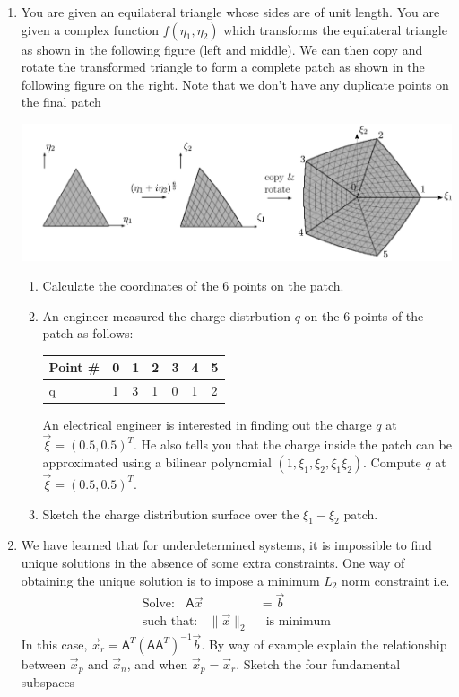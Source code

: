 \documentclass[a4paper, 11pt]{article}
\newcommand{\mat}[1]{\boldsymbol { \mathsf{#1}} }
\begin{document}
\begin{enumerate}
\item You are given an equilateral triangle whose sides are of unit length. You are given a complex function $f(\eta_1, \eta_2)$ which transforms the equilateral triangle as shown in the following figure (left and middle). We can then copy and rotate the transformed triangle to form a complete patch as shown in the following figure on the right. Note that we don't have any duplicate points on the final patch 
\begin{center}
  \includegraphics[scale=0.4]{figs/q1.pdf}
\end{center}
\begin{enumerate}[label=(\alph*)]
\item Calculate the coordinates of the 6 points on the patch.
\item An engineer measured the charge distrbution $q$ on the 6 points of the patch as follows:
    \begin{center}
    \begin{tabular}{ | l | l | l | l | l | l | l |}
    \hline
    Point \# & 0 & 1 & 2 & 3 & 4 & 5  \\ \hline
    q        & 1 & 3 & 1 & 0 & 1 & 2 \\ \hline
    \end{tabular}
    \end{center}
    An electrical engineer is interested in finding out the charge $q$ at $\vec \xi = (0.5, 0.5)^T$. He also tells you that the charge inside the patch can be approximated using a bilinear polynomial $(1, \xi_1, \xi_2,\xi_1\xi_2)$. Compute $q$ at $\vec \xi = (0.5, 0.5)^T$. 
    \item Sketch the charge distribution surface over the $\xi_1 - \xi_2$ patch.
\end{enumerate}

\item We have learned that for underdetermined systems, it is impossible to find unique solutions in the absence of some extra constraints. One way of obtaining the unique solution is to impose a minimum $L_2$ norm constraint i.e.
\begin{align}
\text{Solve: } \;\; \mat A \vec x &= \vec b \\
\text{such that: } \;\; \|\vec x\|_2 &\;\; \text{is minimum}
\end{align}
In this case, $\vec x_r = \mat A^T (\mat A \mat A^T)^{-1} \vec b$. By way of example explain the relationship between $\vec x_p$ and $\vec x_n$, and when $\vec x_p = \vec x_r$. Sketch the four fundamental subspaces


\end{enumerate}
\end{document}
